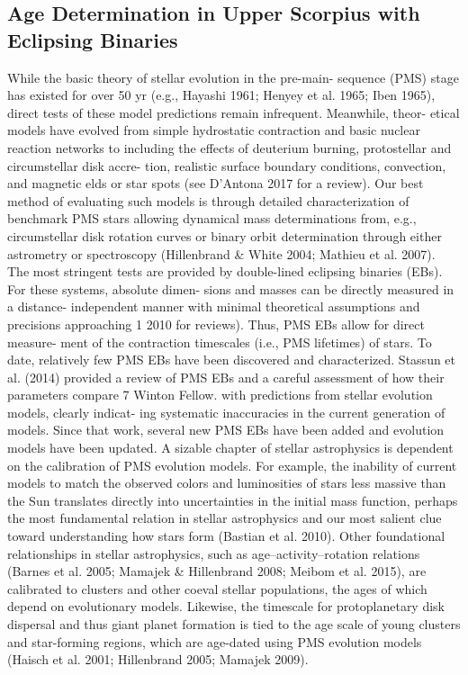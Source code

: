 \documentclass[../main.tex]{subfiles}
\begin{document}
{\subsection{Age Determination in Upper Scorpius with Eclipsing Binaries}

While the basic theory of stellar evolution in the pre-main-
sequence (PMS) stage has existed for over 50 yr (e.g.,
Hayashi 1961; Henyey et al. 1965; Iben 1965), direct tests of
these model predictions remain infrequent. Meanwhile, theor-
etical models have evolved from simple hydrostatic contraction
and basic nuclear reaction networks to including the effects of
deuterium burning, protostellar and circumstellar disk accre-
tion, realistic surface boundary conditions, convection, and
magnetic elds or star spots (see D’Antona 2017 for a review).
Our best method of evaluating such models is through detailed
characterization of benchmark PMS stars allowing dynamical
mass determinations from, e.g., circumstellar disk rotation
curves or binary orbit determination through either astrometry
or spectroscopy (Hillenbrand & White 2004; Mathieu et al.
2007). The most stringent tests are provided by double-lined
eclipsing binaries (EBs). For these systems, absolute dimen-
sions and masses can be directly measured in a distance-
independent manner with minimal theoretical assumptions and
precisions approaching 1%
2010 for reviews). Thus, PMS EBs allow for direct measure-
ment of the contraction timescales (i.e., PMS lifetimes) of stars.
To date, relatively few PMS EBs have been discovered and
characterized. Stassun et al. (2014) provided a review of PMS
EBs and a careful assessment of how their parameters compare
7 Winton Fellow.
with predictions from stellar evolution models, clearly indicat-
ing systematic inaccuracies in the current generation of models.
Since that work, several new PMS EBs have been added and
evolution models have been updated.
A sizable chapter of stellar astrophysics is dependent on the
calibration of PMS evolution models. For example, the
inability of current models to match the observed colors and
luminosities of stars less massive than the Sun translates
directly into uncertainties in the initial mass function, perhaps
the most fundamental relation in stellar astrophysics and our
most salient clue toward understanding how stars form (Bastian
et al. 2010). Other foundational relationships in stellar
astrophysics, such as age–activity–rotation relations (Barnes
et al. 2005; Mamajek & Hillenbrand 2008; Meibom et al.
2015), are calibrated to clusters and other coeval stellar
populations, the ages of which depend on evolutionary models.
Likewise, the timescale for protoplanetary disk dispersal and
thus giant planet formation is tied to the age scale of young
clusters and star-forming regions, which are age-dated using
PMS evolution models (Haisch et al. 2001; Hillenbrand 2005;
Mamajek 2009).

}
\end{document}
